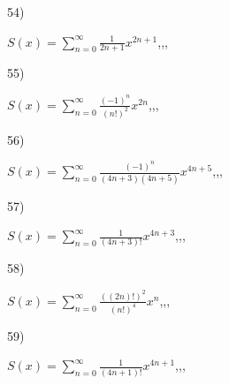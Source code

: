 \documentclass[11pt, ukrainian]{article}
\begin{document}
\par
\vspace{0.9cm}
54) \space 
{%
{$S(x)=\sum\limits_{n=0}^{\infty}{\frac{1}{2n+1}}{x^{{2n+1}}}$},,, \par \smallskip  
}
\par
\vspace{0.9cm}
55) \space 
{%
{$S(x)=\sum\limits_{n=0}^{\infty}{\frac{(-1)^n}{(n!)^2}}{x^{{2n}}}$},,, \par \smallskip  
}
\par
\vspace{0.9cm}
56) \space 
{%
{$S(x)=\sum\limits_{n=0}^{\infty}{\frac{(-1)^n}{(4n+3)(4n+5)}}{x^{{4n+5}}}$},,, \par \smallskip  
}
\par
\vspace{0.9cm}
57) \space 
{%
{$S(x)=\sum\limits_{n=0}^{\infty}{\frac{1}{(4n+3)!}}{x^{{4n+3}}}$},,, \par \smallskip  
}
\par
\vspace{0.9cm}
58) \space 
{%
{$S(x)=\sum\limits_{n=0}^{\infty}{\frac{((2n)!)^2}{(n!)^4}}{x^{{n}}}$},,, \par \smallskip  
}
\par
\vspace{0.9cm}
59) \space 
{%
{$S(x)=\sum\limits_{n=0}^{\infty}{\frac{1}{(4n+1)!}}{x^{{4n+1}}}$},,, \par \smallskip  
}
\end{document}
